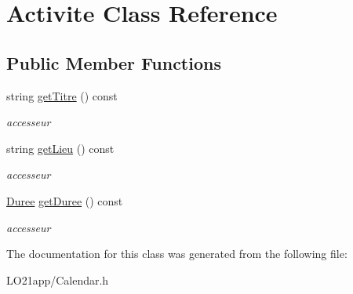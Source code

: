 \hypertarget{class_activite}{}\section{Activite Class Reference}
\label{class_activite}
\subsection*{Public Member Functions}
\begin{DoxyCompactItemize}
\item 
\hypertarget{class_activite_ab0e1e83e41d35906dffc14530826075e}{}string \hyperlink{class_activite_ab0e1e83e41d35906dffc14530826075e}{get\+Titre} () const \label{class_activite_ab0e1e83e41d35906dffc14530826075e}

\begin{DoxyCompactList}\small\item\em accesseur \end{DoxyCompactList}\item 
\hypertarget{class_activite_a695b4d43546d5715977381a7070d66d6}{}string \hyperlink{class_activite_a695b4d43546d5715977381a7070d66d6}{get\+Lieu} () const \label{class_activite_a695b4d43546d5715977381a7070d66d6}

\begin{DoxyCompactList}\small\item\em accesseur \end{DoxyCompactList}\item 
\hypertarget{class_activite_a201ae71f21859cb31fd24c3fd8b1875f}{}\hyperlink{class_t_i_m_e_1_1_duree}{Duree} \hyperlink{class_activite_a201ae71f21859cb31fd24c3fd8b1875f}{get\+Duree} () const \label{class_activite_a201ae71f21859cb31fd24c3fd8b1875f}

\begin{DoxyCompactList}\small\item\em accesseur \end{DoxyCompactList}\end{DoxyCompactItemize}


The documentation for this class was generated from the following file\+:\begin{DoxyCompactItemize}
\item 
L\+O21app/Calendar.\+h\end{DoxyCompactItemize}
